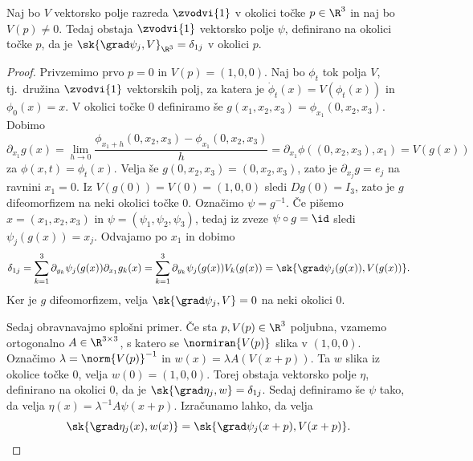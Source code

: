 
\begin{izrek}
  Naj bo $V$ vektorsko polje razreda $\zvodvi{1}$ v okolici točke $p \in \R^3$
  in naj bo $V(p) \ne 0$.
  Tedaj obstaja $\zvodvi{1}$ vektorsko polje $\psi$, definirano na okolici točke
  $p$, da je $\sk{\grad \psi_j, V}_{\R^3} = \delta_{1j}$ v okolici $p$.
\end{izrek}

\begin{proof}
  Privzemimo prvo $p = 0$ in $V(p) = (1,0,0)$.
  Naj bo $\phi_t$ tok polja $V$, tj.~družina $\zvodvi{1}$ vektorskih polj, za
  katera je $\dot{\phi}_t(x) = V(\phi_t(x))$ in $\phi_0(x) = x$.
  V okolici točke $0$ definiramo še $g(x_1, x_2, x_3) = \phi_{x_1}(0, x_2,
  x_3)$.
  Dobimo
  \[
	\partial_{x_1} g(x)
	= \lim_{h \to 0} \frac{\phi_{x_1 + h}(0, x_2, x_3) - \phi_{x_1}(0, x_2,
	  x_3)}{h}
	= \partial_{x_1} \phi((0,x_2, x_3), x_1)
	= V(g(x))
  \]
  za $\phi(x,t) = \phi_t(x)$.
  Velja še $g(0,x_2, x_3) = (0, x_2, x_3)$, zato je $\partial_{x_j} g = e_j$ na
  ravnini $x_1 = 0$.
  Iz $V(g(0)) = V(0) = (1,0,0)$ sledi $Dg(0) = I_3$, zato je $g$ difeomorfizem
  na neki okolici točke $0$.
  Označimo $\psi = g^{-1}$.
  Če pišemo $x = (x_1, x_2, x_3)$ in $\psi = (\psi_1, \psi_2, \psi_3)$, tedaj iz
  zveze $\psi \circ g = \id$ sledi $\psi_j(g(x)) = x_j$.
  Odvajamo po $x_1$ in dobimo
  \[
	\delta_{1j}
	= \sum_{k=1}^3 \partial_{y_k} \psi_j(g(x)) \partial_{x_1} g_k(x)
	= \sum_{k=1}^3 \partial_{y_k} \psi_j(g(x)) V_k(g(x))
	= \sk{\grad \psi_j(g(x)), V(g(x))}.
  \]
  Ker je $g$ difeomorfizem, velja $\sk{\grad \psi_j, V} = 0$ na neki okolici
  $0$.

  Sedaj obravnavajmo splošni primer.
  Če sta $p, V(p) \in \R^3$ poljubna, vzamemo ortogonalno $A \in \R^{3 \times
	3}$, s katero se $\normiran{V(p)}$ slika v $(1,0,0)$.
  Označimo $\lambda = \norm{V(p)}^{-1}$ in $w(x) = \lambda A(V(x + p))$.
  Ta $w$ slika iz okolice točke $0$, velja $w(0) = (1,0,0)$.
  Torej obstaja vektorsko polje $\eta$, definirano na okolici $0$, da je
  $\sk{\grad \eta_j, w} = \delta_{1j}$.
  Sedaj definiramo še $\psi$ tako, da velja $\eta(x) = \lambda^{-1} A \psi(x +
  p)$.
  Izračunamo lahko, da velja
  \[
	\sk{\grad \eta_j(x), w(x)} = \sk{\grad \psi_j(x + p), V(x+p)}.
  \]
\end{proof}


